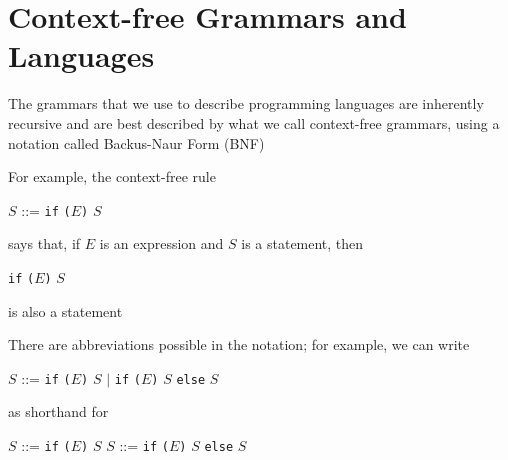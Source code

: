 \documentclass[8pt,a4paper,compress]{beamer}
\newcommand{\mm}[1]{$#1$}
\newenvironment{spaced}
{
\smallskip
\hspace{.5cm}
\begin{minipage}[c]{\textwidth}
}
{
\end{minipage}
\smallskip
}
\begin{document}
\section{Context-free Grammars and Languages}
\begin{frame}[fragile]
\pause

The grammars that we use to describe programming languages are inherently recursive and are best described by what we call context-free grammars, using a notation called Backus-Naur Form (BNF)

\pause
\bigskip

For example, the context-free rule

\text{ }
\begin{spaced}
\begin{production}
\mm{S} ::=  \lstinline{if} \lstinline{(}\mm{E}\lstinline{)} \mm{S}
\end{production}
\end{spaced}

\noindent says that, if \mm{E} is an expression and \mm{S} is a statement, then 

\text{ }
\begin{spaced}
\begin{production}
\lstinline{if} \lstinline{(}\mm{E}\lstinline{)} \mm{S}
\end{production}
\end{spaced}

\noindent is also a statement

\pause
\bigskip

There are abbreviations possible in the notation; for example, we can write

\text{ }
\begin{spaced}
\begin{production}
\mm{S} ::= \lstinline{if} \lstinline{(}\mm{E}\lstinline{)} \mm{S}
      \mm{|} \lstinline{if} \lstinline{(}\mm{E}\lstinline{)} \mm{S} \lstinline{else} \mm{S}
\end{production}
\end{spaced}

\noindent as shorthand for

\text{ }
\begin{spaced}
\begin{production}
\mm{S} ::= \lstinline{if} \lstinline{(}\mm{E}\lstinline{)} \mm{S}
\mm{S} ::= \lstinline{if} \lstinline{(}\mm{E}\lstinline{)} \mm{S} \lstinline{else} \mm{S}
\end{production}
\end{spaced}
\end{frame}
\end{document}
